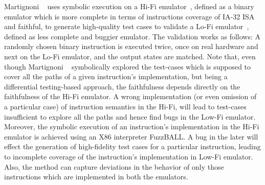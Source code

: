 Martignoni \etal~\cite{Martignoni:ASPLOS2012} uses symbolic execution on a
Hi-Fi emulator~\cite{Bochs1996}, defined  as a binary emulator which is more
complete in terms of instructions coverage of IA-32 ISA and faithful, to
generate high-quality test cases to validate  a Lo-Fi
emulator~\cite{QEMU:USENIX05}, defined as less complete and buggier emulator.
The validation works as follows: A randomly chosen binary instruction is
executed twice, once on real hardware and next on the Lo-Fi emulator, and the
output states are matched.
%
Note that, even though Martignoni
\etal~\cite{Martignoni:ASPLOS2012} symbolically explored the test-cases which
is supposed to cover all the paths of a given instruction's implementation, but
being a differential testing-based approach, the faithfulness depends directly
on  the faithfulness of the Hi-Fi emulator. A wrong implementation (or even
    omission of a particular case) of instruction semantics in the Hi-Fi, will
lead to test-cases insufficient to explore all the paths and hence find bugs in
the Low-Fi emulator. 
%
Moreover, the symbolic execution of an instruction's implementation in the
Hi-Fi emulator is achieved using an X86 interpreter FuzzBALL. A bug in the
later will effect the generation of high-fidelity test cases for a particular
instruction, leading to incomplete coverage of the instruction's implementation
in Low-Fi emulator.
%
 Also, the method can capture  deviations in the behavior of only those
    instructions which are implemented in both the emulators.

